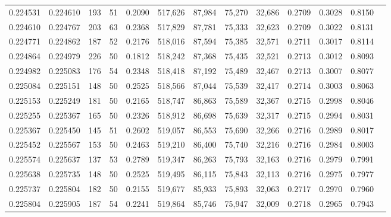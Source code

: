 \begin{tabular}{rrrrrrrrrrrrr}
0.224531 & 0.224610 &   193 &  51 &                                     0.2090 & 517,626 &  87,984 &  75,270 &  32,686 & 0.2709 & 0.3028 & 0.8150 \\
0.224610 & 0.224767 &   203 &  63 &                                     0.2368 & 517,829 &  87,781 &  75,333 &  32,623 & 0.2709 & 0.3022 & 0.8131 \\
0.224771 & 0.224862 &   187 &  52 &                                     0.2176 & 518,016 &  87,594 &  75,385 &  32,571 & 0.2711 & 0.3017 & 0.8114 \\
0.224864 & 0.224979 &   226 &  50 &                                     0.1812 & 518,242 &  87,368 &  75,435 &  32,521 & 0.2713 & 0.3012 & 0.8093 \\
0.224982 & 0.225083 &   176 &  54 &                                     0.2348 & 518,418 &  87,192 &  75,489 &  32,467 & 0.2713 & 0.3007 & 0.8077 \\
0.225084 & 0.225151 &   148 &  50 &                                     0.2525 & 518,566 &  87,044 &  75,539 &  32,417 & 0.2714 & 0.3003 & 0.8063 \\
0.225153 & 0.225249 &   181 &  50 &                                     0.2165 & 518,747 &  86,863 &  75,589 &  32,367 & 0.2715 & 0.2998 & 0.8046 \\
0.225255 & 0.225367 &   165 &  50 &                                     0.2326 & 518,912 &  86,698 &  75,639 &  32,317 & 0.2715 & 0.2994 & 0.8031 \\
0.225367 & 0.225450 &   145 &  51 &                                     0.2602 & 519,057 &  86,553 &  75,690 &  32,266 & 0.2716 & 0.2989 & 0.8017 \\
0.225452 & 0.225567 &   153 &  50 &                                     0.2463 & 519,210 &  86,400 &  75,740 &  32,216 & 0.2716 & 0.2984 & 0.8003 \\
0.225574 & 0.225637 &   137 &  53 &                                     0.2789 & 519,347 &  86,263 &  75,793 &  32,163 & 0.2716 & 0.2979 & 0.7991 \\
0.225638 & 0.225735 &   148 &  50 &                                     0.2525 & 519,495 &  86,115 &  75,843 &  32,113 & 0.2716 & 0.2975 & 0.7977 \\
0.225737 & 0.225804 &   182 &  50 &                                     0.2155 & 519,677 &  85,933 &  75,893 &  32,063 & 0.2717 & 0.2970 & 0.7960 \\
0.225804 & 0.225905 &   187 &  54 &                                     0.2241 & 519,864 &  85,746 &  75,947 &  32,009 & 0.2718 & 0.2965 & 0.7943 \\

\end{tabular}
